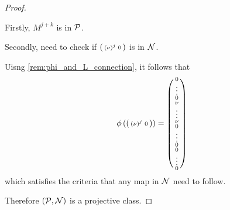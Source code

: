 \begin{proof}
\begin{enumerate}
{            Firstly, \( M^{j + k} \) is in \( {\mathcal{P}} \).

            Secondly, need to check if \( 
                \begin{psmallmatrix}
                    \left( \nu \right)^j & 0
                \end{psmallmatrix}
            \) is in \( {\mathcal{N}} \).

            Uisng \autoref{rem:phi_and_L_connection}, it follows that
            \[
                \phi\left( 
                    \begin{psmallmatrix}
                        \left( \nu \right)^j & 0
                    \end{psmallmatrix}
                 \right)
                =
                \begin{psmallmatrix}
                    0 \\
                    \vdots \\
                    0 \\
                    \nu \\
                    \vdots \\
                    \nu \\
                    0 \\
                    \vdots \\
                    0 \\
                    0 \\
                    \vdots \\
                    0
                \end{psmallmatrix}
            \]
            which satisfies the criteria that any map in \( {\mathcal{N}} \) need to follow.
        }
    \end{enumerate}
    
    Therefore \( \left( {\mathcal{P}}, {\mathcal{N}} \right) \) is a projective class.
\end{proof}